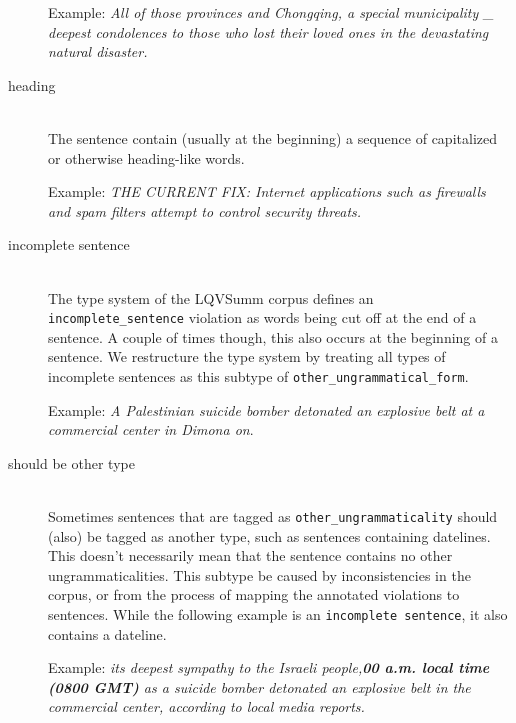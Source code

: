 \documentclass[a4paper,10pt]{scrartcl}
\theoremstyle{style}
\begin{document}
\begin{description}
	Example: \textit{All of those provinces and Chongqing, a special municipality \_ deepest condolences to those who lost their loved ones in the devastating natural disaster.}

\item[heading] \hfill \\
	The sentence contain (usually at the beginning) a sequence of capitalized or otherwise heading-like words. %

	Example: \textit{THE CURRENT FIX: Internet applications such as firewalls and spam filters attempt to control security threats.}

\item[incomplete sentence] \hfill \\
	The type system of the LQVSumm corpus \citep{valeeva} defines an \texttt{incomplete\_sentence} violation as words being cut off at the end of a sentence. A couple of times though, this also occurs at the beginning of a sentence. We restructure the type system by treating all types of incomplete sentences as this subtype of \texttt{other\_ungrammatical\_form}.

	Example: \textit{A Palestinian suicide bomber detonated an explosive belt at a \\commercial center in Dimona on}.
\item[should be other type] \hfill \\
	Sometimes sentences that are tagged as \texttt{other\_ungrammaticality} should (also) be tagged as another type, such as sentences containing datelines. This doesn't necessarily mean that the sentence contains no other ungrammaticalities. This subtype be caused by inconsistencies in the corpus, or from the process of mapping the annotated violations to sentences. While the following example is an \texttt{incomplete sentence}, it also contains a dateline.

	Example: \textit{its deepest sympathy to the Israeli people,\textbf{00 a.m. local time (0800 GMT)} as a suicide bomber detonated an explosive belt in the commercial center, according to local media reports.}
%


\end{description}
\end{document}
